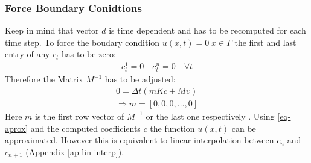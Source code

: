 \subsubsection{Force Boundary Conidtions}
Keep in mind that vector \(d\) is time dependent and has to be recomputed for each time step.
To force the boudary condition \(u(x, t) = 0 \; x \in \Gamma\) the first and last entry of any \(c_{t}\) has to be zero:
\begin{gather}
c_{t}^{1} = 0 \quad c_{t}^{n} = 0 \quad \forall t
\end{gather}
Therefore the Matrix \(M^{-1}\) has to be adjusted:
\begin{gather}
0 = \Delta t (mKc + M\upsilon) \\
\Rightarrow m = [0, 0, 0, \dots , 0] \label{force-bound}
\end{gather}
Here \(m\) is the first row vector of \(M^{-1}\) or the last one respectively \cite{Gustafsson2011b}.
Using \ref{eq-aprox} and the computed coefficients \(c\) the function \(u(x,t)\) can be approximated.
However this is equivalent to linear interpolation between \(c_{n}\) and \(c_{n+1}\) (Appendix \ref{ap-lin-interp}).